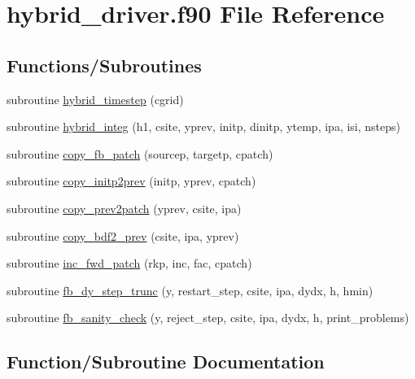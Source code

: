 \hypertarget{hybrid__driver_8f90}{}\section{hybrid\+\_\+driver.\+f90 File Reference}
\label{hybrid__driver_8f90}
\subsection*{Functions/\+Subroutines}
\begin{DoxyCompactItemize}
\item 
subroutine \hyperlink{hybrid__driver_8f90_a9df1061f35d458ad00001665377c1680}{hybrid\+\_\+timestep} (cgrid)
\item 
subroutine \hyperlink{hybrid__driver_8f90_aca3362e241d7c44f74025a34d75c9925}{hybrid\+\_\+integ} (h1, csite, yprev, initp, dinitp, ytemp, ipa, isi, nsteps)
\item 
subroutine \hyperlink{hybrid__driver_8f90_a6108ac8269b762a14258cffcf336d210}{copy\+\_\+fb\+\_\+patch} (sourcep, targetp, cpatch)
\item 
subroutine \hyperlink{hybrid__driver_8f90_a6dd1049ed30fa89e8142c536050401c4}{copy\+\_\+initp2prev} (initp, yprev, cpatch)
\item 
subroutine \hyperlink{hybrid__driver_8f90_a6f82a6d32d5c2c22a4423e4120179d28}{copy\+\_\+prev2patch} (yprev, csite, ipa)
\item 
subroutine \hyperlink{hybrid__driver_8f90_a6e616b8d397c140a91dc2c5daad993cf}{copy\+\_\+bdf2\+\_\+prev} (csite, ipa, yprev)
\item 
subroutine \hyperlink{hybrid__driver_8f90_aeef05e776ee6f7f37ccd5438078c4652}{inc\+\_\+fwd\+\_\+patch} (rkp, inc, fac, cpatch)
\item 
subroutine \hyperlink{hybrid__driver_8f90_a2daa99581dfa5a77ce3305e89cbe7ad1}{fb\+\_\+dy\+\_\+step\+\_\+trunc} (y, restart\+\_\+step, csite, ipa, dydx, h, hmin)
\item 
subroutine \hyperlink{hybrid__driver_8f90_a3103110caad78e9e2f5f0b796f34fc59}{fb\+\_\+sanity\+\_\+check} (y, reject\+\_\+step, csite, ipa, dydx, h,                   print\+\_\+problems)
\end{DoxyCompactItemize}


\subsection{Function/\+Subroutine Documentation}
\hypertarget{hybrid__driver_8f90_a6e616b8d397c140a91dc2c5daad993cf}{}
